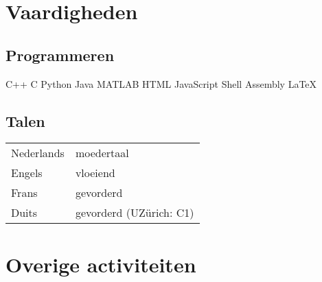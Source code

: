 \documentclass[a4paper]{deedy-resume} %
\begin{document}
\begin{minipage}[t]{0.34\textwidth}

\sectionspace %
\section{Vaardigheden} %

\subsection{Programmeren}

C++ \textbullet{} C \textbullet{} Python \textbullet{} Java \textbullet{}  MATLAB \textbullet{} 
 HTML \textbullet{} JavaScript \textbullet{} Shell \textbullet{} Assembly \textbullet{}  LaTeX \\

\sectionspace %
\subsection{Talen}

\begin{tabular}{@{}ll}
Nederlands & moedertaal\\
Engels & vloeiend\\
Frans & gevorderd\\
Duits & gevorderd (UZ\"{u}rich: C1)\\
\end{tabular}


\sectionspace %
\sectionspace %



\section{Overige activiteiten} 

\end{minipage}
\end{document}

